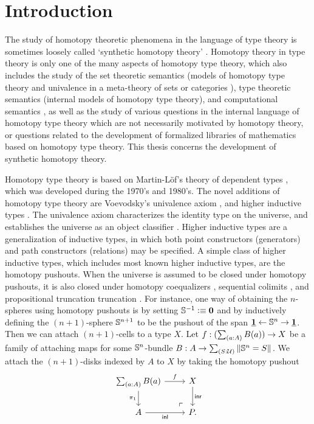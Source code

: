 \chapter{Introduction}
The study of homotopy theoretic phenomena in the language of type theory \cite{hottbook} is 
sometimes loosely called `synthetic homotopy theory' \cite{Brunerie16}. 
Homotopy theory in type theory \cite{Awodey12} is only one of the
many aspects of homotopy type theory, which also includes the study of the
set theoretic semantics (models of homotopy type theory and univalence in a
meta-theory of sets or categories \cite{Awodey14,AwodeyWarren,BezemCoquandHuber,KapulkinLeFanuLumsdaine,Shulman15,Voevodsky15}), type theoretic semantics (internal models of homotopy type
theory), and computational semantics \cite{AngiuliHarperWilson}, as well as the study of various questions
in the internal language of homotopy type theory which are not necessarily 
motivated by homotopy theory, or questions related to the development of
formalized libraries of mathematics based on homotopy type theory.
This thesis concerns the development of synthetic homotopy theory.

Homotopy type theory is based on Martin-L\"of's theory of dependent types \cite{MartinLof84}, which
was developed during the 1970's and 1980's.
The novel additions of homotopy type theory are Voevodsky's univalence axiom \cite{Voevodsky06,Voevodsky10},
and higher inductive types \cite{Lumsdaine11Blog,Shulman11Blog,hottbook}. The univalence axiom characterizes the identity
type on the universe, and establishes the universe as an object classifier \cite{RijkeSpitters}.
Higher inductive types are a generalization of inductive types, in which both
point constructors (generators) and path constructors (relations) may be specified.
A simple class of higher inductive types, which includes most known higher inductive
types, are the homotopy pushouts. When the universe is assumed to be closed
under homotopy pushouts, it is also closed under homotopy coequalizers \cite{hottbook}, 
sequential colimits \cite{hottbook}, and propositional truncation truncation \cite{VanDoorn15}.
For instance, one way of obtaining the $n$-spheres \cite{Lumsdaine12Blog} using homotopy pushouts is by setting $\mathbb{S}^{-1}\vcentcolon\equiv\mathbf{0}$ and
by inductively defining the $(n+1)$-sphere $\mathbb{S}^{n+1}$ to be the pushout
of the span $\underline{\mathbf{1}} \leftarrow\mathbb{S}^{n}\rightarrow\underline{\mathbf{1}}$. 
Then we can attach $(n+1)$-cells to a type $X$.
Let $f:(\sm{a:A}B(a))\to X$ be a family of attaching maps
for some $\mathbb{S}^{n}$-bundle $B:A\to\sm{S:\UU}\brck{\sphere{n}=S}$. We
attach the $(n+1)$-disks indexed by $A$ to $X$ by taking the homotopy pushout
\begin{equation*}
\begin{tikzcd}
\sm{a:A}B(a) \arrow[r,"f"] \arrow[d,swap,"\pi_1"]  & X \arrow[d,"\inr"] \\
A \arrow[r,swap,"\inl"] & P. \arrow[ul,phantom,very near start,"\ulcorner"]
\end{tikzcd}
\end{equation*}

